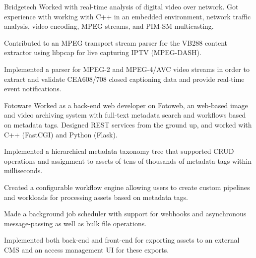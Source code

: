 \begin{experience}{Bridgetech}{
}
Worked with real-time analysis of digital video over network.
Got experience with working with C++ in an embedded environment, network traffic analysis, video encoding, MPEG streams, and PIM-SM multicasting.

\begin{contribs}
	\item{Contributed to an MPEG transport stream parser for the VB288 content extractor using libpcap for live capturing
		IPTV (MPEG-DASH).}
	\item{Implemented a parser for MPEG-2 and MPEG-4/AVC video streams in order to extract and
		validate CEA608/708 closed captioning data and provide real-time event
		notifications.}
\end{contribs}
\end{experience}

\begin{experience}[last]{Fotoware}{
}
Worked as a back-end web developer on Fotoweb, an web-based image and video
archiving system with full-text metadata search and workflows based on
metadata tags. %
Designed REST services from the ground up, and worked with C++ (FastCGI) and Python (Flask). %

\begin{contribs}
	\item{Implemented a hierarchical metadata taxonomy tree that
		supported CRUD operations and assignment to assets of tens of thousands of metadata tags within
		milliseconds.}
	\item{Created a configurable workflow engine allowing users to
		create custom pipelines and workloads for processing assets based on
		metadata tags.}
	\item{Made a background job scheduler with support for
		webhooks and asynchronous message-passing as well as
		bulk file operations.}
	\item{Implemented both back-end and front-end for exporting
		assets to an external CMS and an access 
		management UI for these exports.}
\end{contribs}
\end{experience}


